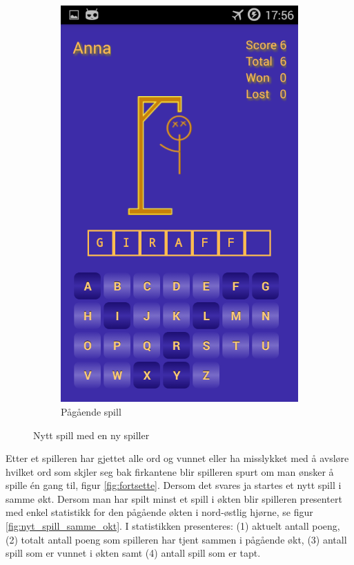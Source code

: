 \begin{figure}[ht]
\begin{subfigure}[b]{0.3\textwidth}
        \includegraphics[width=\textwidth]{./img/bruksanvisning/4.png}
        \caption{Pågående spill}
        \label{fig:spill_igang}
    \end{subfigure}
    \caption{Nytt spill med en ny spiller}\label{fig:new_game_activities}
\end{figure}

Etter et spilleren har gjettet alle ord og vunnet eller ha misslykket med å avsløre hvilket ord som skjler seg bak firkantene blir spilleren spurt om man ønsker å spille én gang til, figur \ref{fig:fortsette}. Dersom det svares ja startes et nytt spill i samme økt. Dersom man har spilt minst et spill i økten blir spilleren presentert med enkel statistikk for den pågående økten i nord-østlig hjørne, se figur \ref{fig:nyt_spill_samme_okt}. I statistikken presenteres: (1) aktuelt antall poeng, (2) totalt antall poeng som spilleren har tjent sammen i pågående økt, (3) antall spill som er vunnet i økten samt (4) antall spill som er tapt. 

